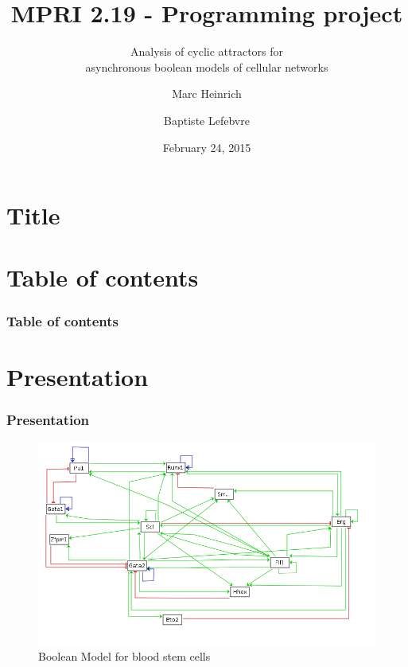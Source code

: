 \documentclass{beamer}
\title{MPRI 2.19 - Programming project}
\subtitle{Analysis of cyclic attractors for \\ asynchronous boolean models of cellular networks}
\author{Marc Heinrich \and Baptiste Lefebvre}
\institute{École Normale Supérieure, Computer Science Department}
\date{February 24, 2015}
\begin{document}
\section*{Title}

\begin{frame}
  \titlepage
\end{frame}


\section*{Table of contents}

\begin{frame}
  \frametitle{Table of contents}
  \tableofcontents
\end{frame} 



\section{Presentation}

\begin{frame}
  \frametitle{Presentation}    
  \begin{figure}
    \includegraphics[scale=0.4]{img/hematopoietic}
    \caption{Boolean Model for blood stem cells \cite{Bonzanni}}
  \end{figure}
\end{frame}
\end{document}
